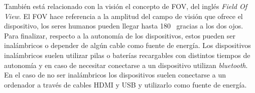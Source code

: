 También está relacionado con la visión el concepto de FOV, del inglés \textit{Field Of View}. El FOV hace referencia a la amplitud del campo de visión que ofrece el dispositivo, los seres humanos pueden llegar hasta 180\degree~ gracias a los dos ojos.\\

Para finalizar, respecto a la autonomía de los dispositivos, estos pueden ser inalámbricos o depender de algún cable como fuente de energía. Los dispositivos inalámbricos suelen utilizar pilas o baterías recargables con distintos tiempos de autonomía y en caso de necesitar conectarse a un dispositivo utilizan \textit{bluetooth}. En el caso de no ser inalámbricos los dispositivos suelen conectarse a un ordenador a través de cables HDMI y USB y utilizarlo como fuente de energía.



